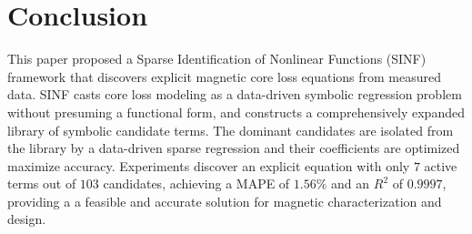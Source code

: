 \section{Conclusion}

This paper proposed a Sparse Identification of Nonlinear Functions (SINF) framework that discovers explicit magnetic core loss equations from measured data. SINF casts core loss modeling as a data-driven symbolic regression problem without presuming a functional form, and constructs a comprehensively expanded library of symbolic candidate terms. The dominant candidates are isolated from the library by a data-driven sparse regression and their coefficients are optimized maximize accuracy. Experiments discover an explicit equation with only $7$ active terms out of $103$ candidates, achieving a MAPE of $1.56\%$ and an $R^2$ of $0.9997$, providing a a feasible and accurate solution for magnetic characterization and design.